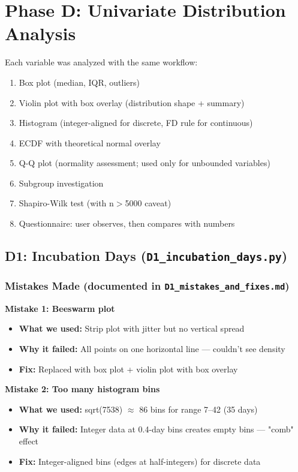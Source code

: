 \documentclass[11pt,a4paper]{article}
\begin{document}
\newpage

\section{Phase D: Univariate Distribution Analysis}

Each variable was analyzed with the same workflow:
\begin{enumerate}
\item Box plot (median, IQR, outliers)
\item Violin plot with box overlay (distribution shape + summary)
\item Histogram (integer-aligned for discrete, FD rule for continuous)
\item ECDF with theoretical normal overlay
\item Q-Q plot (normality assessment; used only for unbounded variables)
\item Subgroup investigation
\item Shapiro-Wilk test (with n$>$5000 caveat)
\item Questionnaire: user observes, then compares with numbers
\end{enumerate}

\subsection{D1: Incubation Days (\texttt{D1\_incubation\_days.py})}

\subsubsection*{Mistakes Made (documented in \texttt{D1\_mistakes\_and\_fixes.md})}

\textbf{Mistake 1: Beeswarm plot}
\begin{itemize}
\item \textbf{What we used:} Strip plot with jitter but no vertical spread
\item \textbf{Why it failed:} All points on one horizontal line --- couldn't see density
\item \textbf{Fix:} Replaced with box plot + violin plot with box overlay
\end{itemize}

\textbf{Mistake 2: Too many histogram bins}
\begin{itemize}
\item \textbf{What we used:} sqrt(7538) $\approx$ 86 bins for range 7--42 (35 days)
\item \textbf{Why it failed:} Integer data at 0.4-day bins creates empty bins --- "comb" effect
\item \textbf{Fix:} Integer-aligned bins (edges at half-integers) for discrete data
\end{itemize}
\end{document}

